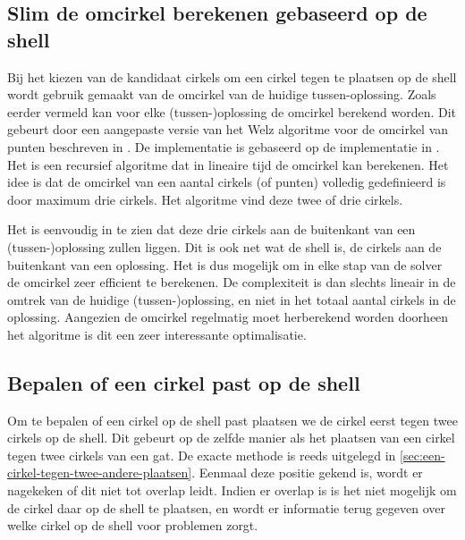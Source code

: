 \documentclass[12pt,a4paper,oneside]{book}
\begin{document}
\subsection{Slim de omcirkel berekenen gebaseerd op de shell}

Bij het kiezen van de kandidaat cirkels om een cirkel tegen te plaatsen op de shell wordt gebruik gemaakt van de omcirkel van de huidige tussen-oplossing.
Zoals eerder vermeld kan voor elke (tussen-)oplossing de omcirkel berekend worden.
Dit gebeurt door een aangepaste versie van het Welz algoritme voor de omcirkel van punten beschreven in \cite{welzl1991smallest}.
De implementatie is gebaseerd op de implementatie in \cite{sunshine2008welzl}.
Het is een recursief algoritme dat in lineaire tijd de omcirkel kan berekenen.
Het idee is dat de omcirkel van een aantal cirkels (of punten) volledig gedefinieerd is door maximum drie cirkels.
Het algoritme vind deze twee of drie cirkels.

Het is eenvoudig in te zien dat deze drie cirkels aan de buitenkant van een (tussen-)oplossing zullen liggen.
Dit is ook net wat de shell is, de cirkels aan de buitenkant van een oplossing.
Het is dus mogelijk om in elke stap van de solver de omcirkel zeer efficient te berekenen.
De complexiteit is dan slechts lineair in de omtrek van de huidige (tussen-)oplossing, en niet in het totaal aantal cirkels in de oplossing.
Aangezien de omcirkel regelmatig moet herberekend worden doorheen het algoritme is dit een zeer interessante optimalisatie.

\subsection{Bepalen of een cirkel past op de shell} \label{sec:bepalen-of-een-cirkel-past-op-de-shell}

Om te bepalen of een cirkel op de shell past plaatsen we de cirkel eerst tegen twee cirkels op de shell.
Dit gebeurt op de zelfde manier als het plaatsen van een cirkel tegen twee cirkels van een gat.
De exacte methode is reeds uitgelegd in \autoref{sec:een-cirkel-tegen-twee-andere-plaatsen}.
Eenmaal deze positie gekend is, wordt er nagekeken of dit niet tot overlap leidt.
Indien er overlap is is het niet mogelijk om de cirkel daar op de shell te plaatsen, en wordt er informatie terug gegeven over welke cirkel op de shell voor problemen zorgt.
\end{document}

